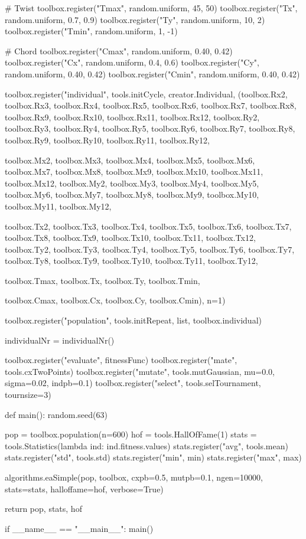 \begin{pythoncode}
# Twist 
toolbox.register("Tmax", random.uniform, 45, 50)
toolbox.register("Tx", random.uniform, 0.7, 0.9)
toolbox.register("Ty", random.uniform, 10, 2)
toolbox.register("Tmin", random.uniform, 1, -1)

# Chord 
toolbox.register("Cmax", random.uniform, 0.40, 0.42)
toolbox.register("Cx", random.uniform, 0.4, 0.6)
toolbox.register("Cy", random.uniform, 0.40, 0.42)
toolbox.register("Cmin", random.uniform, 0.40, 0.42)



toolbox.register("individual", tools.initCycle, creator.Individual,
                 (toolbox.Rx2, toolbox.Rx3, toolbox.Rx4, toolbox.Rx5, toolbox.Rx6, toolbox.Rx7, 
                  toolbox.Rx8, toolbox.Rx9, toolbox.Rx10, toolbox.Rx11, toolbox.Rx12, 
                  toolbox.Ry2, toolbox.Ry3, toolbox.Ry4, toolbox.Ry5, toolbox.Ry6, toolbox.Ry7, 
                  toolbox.Ry8, toolbox.Ry9, toolbox.Ry10, toolbox.Ry11, toolbox.Ry12, 

                  toolbox.Mx2, toolbox.Mx3, toolbox.Mx4, toolbox.Mx5, toolbox.Mx6, toolbox.Mx7, 
                  toolbox.Mx8, toolbox.Mx9, toolbox.Mx10, toolbox.Mx11, toolbox.Mx12, 
                  toolbox.My2, toolbox.My3, toolbox.My4, toolbox.My5, toolbox.My6, toolbox.My7, 
                  toolbox.My8, toolbox.My9, toolbox.My10, toolbox.My11, toolbox.My12, 

                  toolbox.Tx2, toolbox.Tx3, toolbox.Tx4, toolbox.Tx5, toolbox.Tx6, toolbox.Tx7, 
                  toolbox.Tx8, toolbox.Tx9, toolbox.Tx10, toolbox.Tx11, toolbox.Tx12, 
                  toolbox.Ty2, toolbox.Ty3, toolbox.Ty4, toolbox.Ty5, toolbox.Ty6, toolbox.Ty7, 
                  toolbox.Ty8, toolbox.Ty9, toolbox.Ty10, toolbox.Ty11, toolbox.Ty12, 

                  toolbox.Tmax, toolbox.Tx, toolbox.Ty, toolbox.Tmin,

                  toolbox.Cmax, toolbox.Cx, toolbox.Cy, toolbox.Cmin), n=1)

toolbox.register("population", tools.initRepeat, list, toolbox.individual)

 
individualNr = individualNr()

toolbox.register("evaluate", fitnessFunc)
toolbox.register("mate", tools.cxTwoPoints)
toolbox.register("mutate", tools.mutGaussian, mu=0.0, sigma=0.02, indpb=0.1)
toolbox.register("select", tools.selTournament, tournsize=3)

def main():
    random.seed(63)
    
    pop = toolbox.population(n=600)
    hof = tools.HallOfFame(1)
    stats = tools.Statistics(lambda ind: ind.fitness.values)
    stats.register("avg", tools.mean)
    stats.register("std", tools.std)
    stats.register("min", min)
    stats.register("max", max)
    
    algorithms.eaSimple(pop, toolbox, cxpb=0.5, mutpb=0.1, ngen=10000, stats=stats,
                        halloffame=hof, verbose=True)
    
    return pop, stats, hof

if __name__ == "__main__":
    main()





\end{pythoncode}